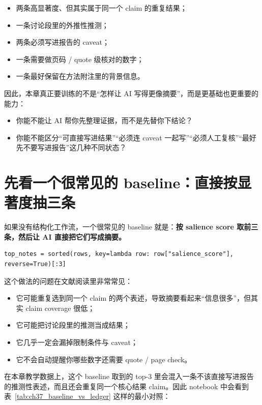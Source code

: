 \begin{itemize}
    \item 两条高显著度、但其实属于同一个 claim 的重复结果；
    \item 一条讨论段里的外推性推测；
    \item 两条必须写进报告的 caveat；
    \item 一条需要做页码 / quote 级核对的数字；
    \item 一条最好保留在方法附注里的背景信息。
\end{itemize}

因此，本章真正要训练的不是“怎样让 AI 写得更像摘要”，而是更基础也更重要的能力：

\begin{itemize}
    \item 你能不能让 AI 帮你先整理证据，而不是先替你下结论？
    \item 你能不能区分“可直接写进结果”“必须连 caveat 一起写”“必须人工复核”“最好先不要写进报告”这几种不同状态？
\end{itemize}

\section{先看一个很常见的 baseline：直接按显著度抽三条}

如果没有结构化工作流，一个很常见的 baseline 就是：\textbf{按 salience score 取前三条，然后让 AI 直接把它们写成摘要。}

\begin{examplebox}
\begin{lstlisting}[style=pythonstyle]
top_notes = sorted(rows, key=lambda row: row["salience_score"], reverse=True)[:3]
\end{lstlisting}
\end{examplebox}

这个做法的问题在文献阅读里非常常见：

\begin{itemize}
    \item 它可能重复选到同一个 claim 的两个表述，导致摘要看起来“信息很多”，但其实 claim coverage 很低；
    \item 它可能把讨论段里的推测当成结果；
    \item 它几乎一定会漏掉限制条件与 caveat；
    \item 它不会自动提醒你哪些数字还需要 quote / page check。
\end{itemize}

在本章教学数据上，这个 baseline 取到的 top-3 里会混入一条不该直接写进报告的推测性表述，而且还会重复同一个核心结果 claim。因此 notebook 中会看到表~\ref{tab:ch37_baseline_vs_ledger} 这样的最小对照：

